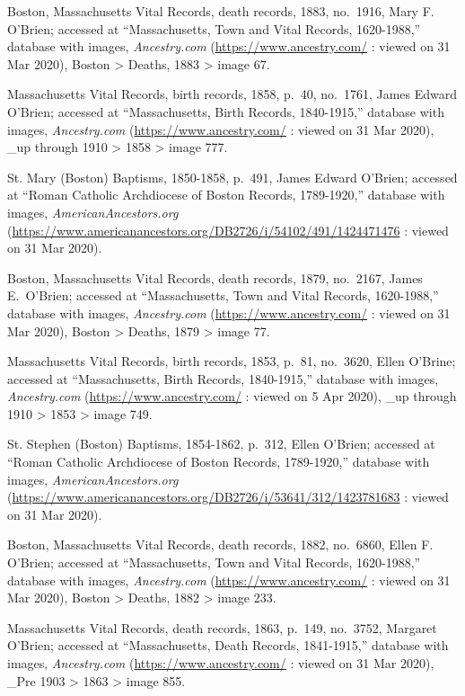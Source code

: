 \begin{thebibliography}{99}
	Boston, Massachusetts Vital Records, death records, 1883, no.\ 1916, Mary F. O'Brien; accessed at ``Massachusetts, Town and Vital Records, 1620-1988,'' database with images, \textit{Ancestry.com} (\url{https://www.ancestry.com/} : viewed on 31 Mar 2020), Boston > Deaths, 1883 > image 67.
	
	Massachusetts Vital Records, birth records, 1858, p.\ 40, no.\ 1761, James Edward O'Brien; accessed at ``Massachusetts, Birth Records, 1840-1915,'' database with images, \textit{Ancestry.com} (\url{https://www.ancestry.com/} : viewed on 31 Mar 2020), \_up through 1910 > 1858 > image 777.
	
	St. Mary (Boston) Baptisms, 1850-1858, p.\ 491, James Edward O'Brien; accessed at ``Roman Catholic Archdiocese of Boston Records, 1789-1920,'' database with images, \textit{AmericanAncestors.org} (\url{https://www.americanancestors.org/DB2726/i/54102/491/1424471476} : viewed on 31 Mar 2020).
	
	Boston, Massachusetts Vital Records, death records, 1879, no.\ 2167, James E.\ O'Brien; accessed at ``Massachusetts, Town and Vital Records, 1620-1988,'' database with images, \textit{Ancestry.com} (\url{https://www.ancestry.com/} : viewed on 31 Mar 2020), Boston > Deaths, 1879 > image 77.
	
	Massachusetts Vital Records, birth records, 1853, p.\ 81, no.\ 3620, Ellen O'Brine; accessed at ``Massachusetts, Birth Records, 1840-1915,'' database with images, \textit{Ancestry.com} (\url{https://www.ancestry.com/} : viewed on 5 Apr 2020), \_up through 1910 > 1853 > image 749.
	
	St. Stephen (Boston) Baptisms, 1854-1862, p.\ 312, Ellen O'Brien; accessed at ``Roman Catholic Archdiocese of Boston Records, 1789-1920,'' database with images, \textit{AmericanAncestors.org} (\url{https://www.americanancestors.org/DB2726/i/53641/312/1423781683} : viewed on 31 Mar 2020).
	
	Boston, Massachusetts Vital Records, death records, 1882, no.\ 6860, Ellen F. O'Brien; accessed at ``Massachusetts, Town and Vital Records, 1620-1988,'' database with images, \textit{Ancestry.com} (\url{https://www.ancestry.com/} : viewed on 31 Mar 2020), Boston > Deaths, 1882 > image 233.
	
	Massachusetts Vital Records, death records, 1863, p.\ 149, no.\ 3752, Margaret O'Brien; accessed at ``Massachusetts, Death Records, 1841-1915,'' database with images, \textit{Ancestry.com} (\url{https://www.ancestry.com/} : viewed on 31 Mar 2020), \_Pre 1903 > 1863 > image 855.
	

\end{thebibliography}
